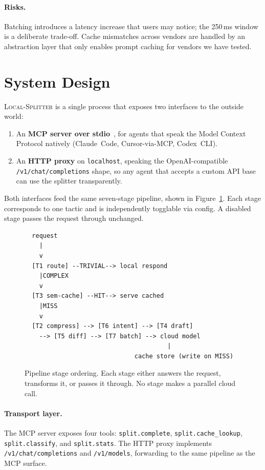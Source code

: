\documentclass[11pt,a4paper]{article}
\begin{document}
\paragraph{Risks.}
Batching introduces a latency increase that users may notice; the
250\,ms window is a deliberate trade-off. Cache mismatches across
vendors are handled by an abstraction layer that only enables prompt
caching for vendors we have tested.

\section{System Design}
\label{sec:system}

\textsc{Local-Splitter} is a single process that exposes two interfaces
to the outside world:

\begin{enumerate}
  \item An \textbf{MCP server over stdio}~\cite{mcp-spec}, for agents
    that speak the Model Context Protocol natively (Claude~Code,
    Cursor-via-MCP, Codex~CLI).
  \item An \textbf{HTTP proxy} on \texttt{localhost}, speaking the
    OpenAI-compatible \texttt{/v1/chat/completions} shape, so any agent
    that accepts a custom API base can use the splitter transparently.
\end{enumerate}

Both interfaces feed the same seven-stage pipeline, shown in
Figure~\ref{fig:pipeline}. Each stage corresponds to one tactic and is
independently togglable via config. A disabled stage passes the request
through unchanged.

\begin{figure}[h]
\centering
\small
\begin{verbatim}
  request
    |
    v
  [T1 route] --TRIVIAL--> local respond
    |COMPLEX
    v
  [T3 sem-cache] --HIT--> serve cached
    |MISS
    v
  [T2 compress] --> [T6 intent] --> [T4 draft]
    --> [T5 diff] --> [T7 batch] --> cloud model
                                       |
                              cache store (write on MISS)
\end{verbatim}
\caption{Pipeline stage ordering. Each stage either answers the request,
  transforms it, or passes it through. No stage makes a parallel cloud
  call.}
\label{fig:pipeline}
\end{figure}

\paragraph{Transport layer.}
The MCP server exposes four tools: \texttt{split.complete},
\texttt{split.cache\_lookup}, \texttt{split.classify}, and
\texttt{split.stats}. The HTTP proxy implements
\texttt{/v1/chat/completions} and \texttt{/v1/models}, forwarding to
the same pipeline as the MCP surface.
\end{document}
